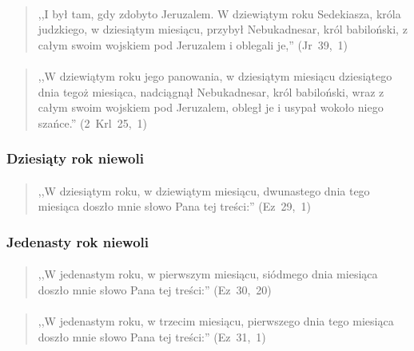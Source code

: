\documentclass[10pt,a4paper,oneside]{article}
\begin{document}
\paragraph{}
\begin{quote}
,,I był tam, gdy zdobyto Jeruzalem. W dziewiątym roku Sedekiasza, króla judzkiego, w dziesiątym miesiącu, przybył Nebukadnesar, król babiloński, z całym swoim wojskiem pod Jeruzalem i oblegali je,'' \mbox{(Jr 39, 1)}
\end{quote}
\paragraph{}
\begin{quote}
,,W dziewiątym roku jego panowania, w dziesiątym miesiącu dziesiątego dnia tegoż miesiąca, nadciągnął Nebukadnesar, król babiloński, wraz z całym swoim wojskiem pod Jeruzalem, obległ je i usypał wokoło niego szańce.'' \mbox{(2 Krl 25, 1)}
\end{quote}
\subsubsection{Dziesiąty rok niewoli}
\paragraph{}
\begin{quote}
,,W dziesiątym roku, w dziewiątym miesiącu, dwunastego dnia tego miesiąca doszło mnie słowo Pana tej treści:'' \mbox{(Ez 29, 1)}
\end{quote}
\subsubsection{Jedenasty rok niewoli}
\paragraph{}
\begin{quote}
,,W jedenastym roku, w pierwszym miesiącu, siódmego dnia miesiąca doszło mnie słowo Pana tej treści:'' \mbox{(Ez 30, 20)}
\end{quote}
\paragraph{}
\begin{quote}
,,W jedenastym roku, w trzecim miesiącu, pierwszego dnia tego miesiąca doszło mnie słowo Pana tej treści:'' \mbox{(Ez 31, 1)}
\end{quote}
\end{document}
